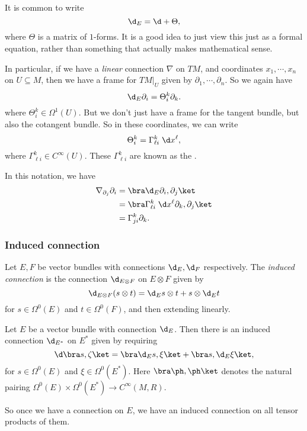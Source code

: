 \documentclass[a4paper]{article}
\begin{document}
It is common to write
\[
  \d_E = \d + \Theta,
\]
where $\Theta$ is a matrix of $1$-forms. It is a good idea to just view this just as a formal equation, rather than something that actually makes mathematical sense.

In particular, if we have a \emph{linear} connection $\nabla$ on $TM$, and coordinates $x_1, \cdots, x_n$ on $U \subseteq M$, then we have a frame for $TM|_U$ given by $\partial_1, \cdots, \partial_n$. So we again have
\[
  \d_E \partial_i = \Theta_i^k \partial_k.
\]
where $\Theta_i^k \in \Omega^1(U)$. But we don't just have a frame for the tangent bundle, but also the cotangent bundle. So in these coordinates, we can write
\[
  \Theta_i^k = \Gamma_{\ell i}^k\; \d x^\ell,
\]
where $\Gamma_{\ell i}^k \in C^\infty(U)$. These $\Gamma_{\ell i}^k$ are known as the .

In this notation, we have
\begin{align*}
  \nabla_{\partial_j} \partial_i &= \bra \d_E \partial_i, \partial_j\ket\\
  &= \bra \Gamma_{\ell i}^k \;\d x^\ell \partial_k, \partial_j\ket\\
  &= \Gamma^k_{ji} \partial_k.
\end{align*}

\subsubsection*{Induced connection}
\begin{defi}
  Let $E, F$ be vector bundles with connections $\d_E, \d_F$ respectively. The \emph{induced connection} is the connection $\d_{E \otimes F}$ on $E \otimes F$ given by
  \[
    \d_{E \otimes F}(s \otimes t) = \d_E s \otimes t + s \otimes \d_E t
  \]
  for $s \in \Omega^0(E)$ and $t \in \Omega^0(F)$, and then extending linearly.
\end{defi}

\begin{defi}
  Let $E$ be a vector bundle with connection $\d_E$. Then there is an induced connection $\d_{E^*}$ on $E^*$ given by requiring
  \[
    \d\bra s, \zeta\ket = \bra \d_E s, \xi\ket + \bra s, \d_E \xi\ket,
  \]
  for $s \in \Omega^0(E)$ and $\xi \in \Omega^0(E^*)$. Here $\bra \ph, \ph\ket$ denotes the natural pairing $\Omega^0(E) \times \Omega^0(E^*) \to C^\infty(M, R)$.
\end{defi}
So once we have a connection on $E$, we have an induced connection on all tensor products of them.
\end{document}
